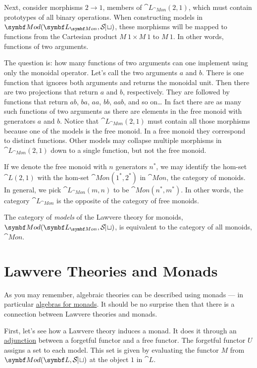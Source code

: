 Next, consider morphisms $2 \to 1$, members of
$\cat{L}_{\cat{Mon}}(2, 1)$, which must contain prototypes of all binary
operations. When constructing models in $\cat{Mod}(\cat{L}_{\cat{Mon}}, \Set)$, these
morphisms will be mapped to functions from the Cartesian product
$M\ 1 \times M\ 1$ to $M\ 1$. In other words, functions of
two arguments.

The question is: how many functions of two arguments can one implement
using only the monoidal operator. Let's call the two arguments
$a$ and $b$. There is one function that ignores both
arguments and returns the monoidal unit. Then there are two projections
that return $a$ and $b$, respectively. They are followed
by functions that return $ab$, $ba$, $aa$,
$bb$, $aab$, and so on\ldots{} In fact there are as many
such functions of two arguments as there are elements in the free monoid
with generators $a$ and $b$. Notice that
$\cat{L}_{\cat{Mon}}(2, 1)$ must contain all those morphisms because one of the
models is the free monoid. In a free monoid they correspond to distinct
functions. Other models may collapse multiple morphisms in
$\cat{L}_{\cat{Mon}}(2, 1)$ down to a single function, but not the free monoid.

If we denote the free monoid with $n$ generators $n^*$, we may
identify the hom-set $\cat{L}(2, 1)$ with the hom-set
$\cat{Mon}(1^*, 2^*)$ in $\cat{Mon}$, the category of monoids. In
general, we pick $\cat{L}_{\cat{Mon}}(m, n)$ to be $\cat{Mon}(n^*, m^*)$. In
other words, the category $\cat{L}_{\cat{Mon}}$ is the opposite of the category
of free monoids.

The category of \emph{models} of the Lawvere theory for monoids,\\
$\cat{Mod}(\cat{L}_{\cat{Mon}}, \Set)$, is equivalent to the category of all monoids,
$\cat{Mon}$.

\section{Lawvere Theories and Monads}

As you may remember, algebraic theories can be described using monads
--- in particular
\hyperref[algebras-for-monads]{algebras
for monads}. It should be no surprise then that there is a connection
between Lawvere theories and monads.

First, let's see how a Lawvere theory induces a monad. It does it
through an
\hyperref[free-forgetful-adjunctions]{adjunction}
between a forgetful functor and a free functor. The forgetful functor
$U$ assigns a set to each model. This set is given by evaluating
the functor $M$ from $\cat{Mod}(\cat{L}, \Set)$ at the object $1$ in
$\cat{L}$.

